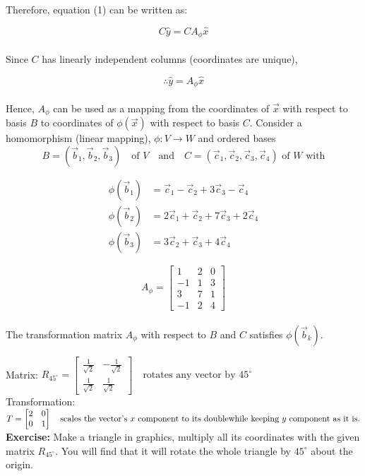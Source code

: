 \documentclass[12pt]{article}
\begin{document}
Therefore, equation (1) can be written as:

$$
C \hat{y} = C A_\phi \hat{x}
$$\\
Since \( C \) has linearly independent columns (coordinates are unique),

\[
\therefore \hat{y} = A_\phi \hat{x}
\]
\\
Hence, \( A_\phi \) can be used as a mapping from the coordinates of \( \vec{x} \) with respect to basis \( B \) to coordinates of \( \phi(\vec{x}) \) with respect to basis \( C \).
\newpage
Consider a homomorphism (linear mapping), \(\phi: V \to W\) and ordered bases
$$
B = (\vec{b}_1, \vec{b}_2, \vec{b}_3) \quad \text{of } V \quad \text{and} \quad C = (\vec{c}_1, \vec{c}_2, \vec{c}_3, \vec{c}_4)  \text{ of }W \text{ with}
$$

\[
\begin{aligned}
\phi(\vec{b}_1) &= \vec{c}_1 - \vec{c}_2 + 3\vec{c}_3 - \vec{c}_4 \\
\phi(\vec{b}_2) &= 2\vec{c}_1 + \vec{c}_2 + 7\vec{c}_3 + 2\vec{c}_4 \\
\phi(\vec{b}_3) &= 3\vec{c}_2 + \vec{c}_3 + 4\vec{c}_4
\end{aligned}
\]

$$
A_\phi =
\begin{bmatrix}
1 & 2 & 0 \\
-1 & 1 & 3 \\
3 & 7 & 1 \\
-1 & 2 & 4
\end{bmatrix}
$$
\\
The transformation matrix \( A_\phi \) with respect to \( B \) and \( C \) satisfies \( \phi(\vec{b}_k) \).

Matrix:
$
R_{45^\circ} = \begin{bmatrix}
\frac{1}{\sqrt{2}} & -\frac{1}{\sqrt{2}} \\
\frac{1}{\sqrt{2}} & \frac{1}{\sqrt{2}}
\end{bmatrix}
\quad \text{rotates any vector by } 45^\circ
$\\
\newline
Transformation:
$
T = \begin{bmatrix}
2 & 0 \\
0 & 1
\end{bmatrix}
\quad \text{scales the vector's } x \text{ component to its double \\while keeping } y \text{ component as it is}.
$
\newline
\\
\textbf{Exercise:} Make a triangle in graphics, multiply all its coordinates with the given matrix \( R_{45^\circ} \). You will find that it will rotate the whole triangle by \( 45^\circ \) about the origin.
\end{document}
